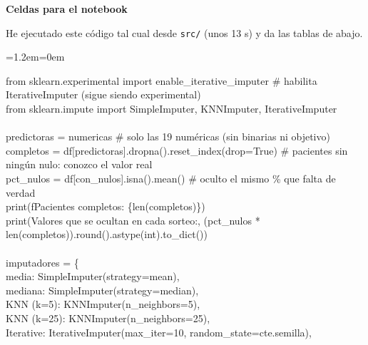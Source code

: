 \documentclass[11pt,a4paper]{article}
\newenvironment{codigo}
  {\par\smallskip\begin{list}{}{\leftmargin=1.2em\rightmargin=0em}\item\relax\ttfamily\scriptsize\raggedright}
  {\end{list}\smallskip}
\begin{document}
{\smallskip\noindent\textbf{Celdas para el notebook}\par
He ejecutado este código tal cual desde \texttt{src/\allowbreak{}} (unos 13 s) y da las tablas de abajo.

\begin{codigo}
from sklearn.experimental import enable\_\allowbreak{}iterative\_\allowbreak{}imputer  \# habilita IterativeImputer (sigue siendo experimental) \\{}
from sklearn.impute import SimpleImputer, KNNImputer, IterativeImputer \\{}
\mbox{} \\{}
predictoras = numericas                                     \# solo las 19 numéricas (sin binarias ni objetivo) \\{}
completos = df[predictoras].dropna().reset\_\allowbreak{}index(drop=True)  \# pacientes sin ningún nulo: conozco el valor real \\{}
pct\_\allowbreak{}nulos = df[con\_\allowbreak{}nulos].isna().mean()                      \# oculto el mismo \% que falta de verdad \\{}
print(f\textquotedbl{}Pacientes completos: \{len(completos)\}\textquotedbl{}) \\{}
print(\textquotedbl{}Valores que se ocultan en cada sorteo:\textquotedbl{}, (pct\_\allowbreak{}nulos * len(completos)).round().astype(int).to\_\allowbreak{}dict()) \\{}
\mbox{} \\{}
imputadores = \{ \\{}
\hspace*{2.08em}\textquotedbl{}media\textquotedbl{}: SimpleImputer(strategy=\textquotedbl{}mean\textquotedbl{}), \\{}
\hspace*{2.08em}\textquotedbl{}mediana\textquotedbl{}: SimpleImputer(strategy=\textquotedbl{}median\textquotedbl{}), \\{}
\hspace*{2.08em}\textquotedbl{}KNN (k=5)\textquotedbl{}: KNNImputer(n\_\allowbreak{}neighbors=5), \\{}
\hspace*{2.08em}\textquotedbl{}KNN (k=25)\textquotedbl{}: KNNImputer(n\_\allowbreak{}neighbors=25), \\{}
\hspace*{2.08em}\textquotedbl{}Iterative\textquotedbl{}: IterativeImputer(max\_\allowbreak{}iter=10, random\_\allowbreak{}state=cte.semilla), \\{}

\end{codigo}}
\end{document}
